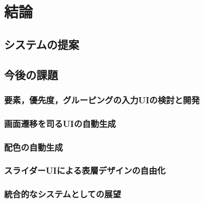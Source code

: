 \chapter{結論}
\label{chap:conclusion}

\section{システムの提案}

\section{今後の課題}
\subsection{要素，優先度，グルーピングの入力UIの検討と開発}
\subsection{画面遷移を司るUIの自動生成}
\subsection{配色の自動生成}
\subsection{スライダーUIによる表層デザインの自由化}
\subsection{統合的なシステムとしての展望}
